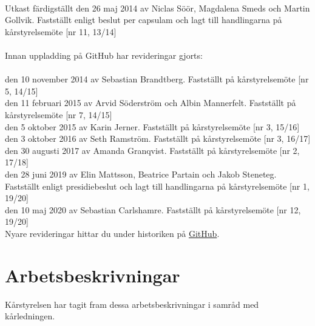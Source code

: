 
\newcommand{\sectionbreak}{\clearpage}


%
%
\vspace*{9 cm}
\noindent
{\huge{}}\\

\vspace{0.2cm}
\noindent
Utkast färdigställt den 26 maj 2014 av Niclas Söör, Magdalena Smeds och
Martin Gollvik. Fastställt enligt beslut per capsulam och lagt till
handlingarna på kårstyrelsemöte {[}nr 11, 13/14{]} \\ \\
Innan uppladding på GitHub har revideringar gjorts:\\ \\
  den 10 november 2014 av Sebastian Brandtberg. Fastställt på
  kårstyrelsemöte {[}nr 5, 14/15{]} \\
  den 11 februari 2015 av Arvid Söderström och Albin Mannerfelt.
  Fastställt på kårstyrelsemöte {[}nr 7, 14/15{]} \\
  den 5 oktober 2015 av Karin Jerner. Fastställt på kårstyrelsemöte
  {[}nr 3, 15/16{]} \\
  den 3 oktober 2016 av Seth Ramström. Fastställt på kårstyrelsemöte
  {[}nr 3, 16/17{]} \\
  den 30 augusti 2017 av Amanda Granqvist. Fastställt på kårstyrelsemöte
  {[}nr 2, 17/18{]} \\
  den 28 juni 2019 av Elin Mattsson, Beatrice Partain och Jakob
  Steneteg. Fastställt enligt presidiebeslut och lagt till handlingarna
  på kårstyrelsemöte {[}nr 1, 19/20{]} \\
  den 10 maj 2020 av Sebastian Carlshamre. Fastställt på kårstyrelsemöte
  {[}nr 12, 19/20{]} \\
  
  
  Nyare revideringar hittar du under historiken på \href{https://github.com/lucassevelin/Arbetsbeskrivningar-p-steroider}{GitHub}.

%
%
\vspace*{1 mm}
\tableofcontents

\hypertarget{arbetsbeskrivningar}{%
\section{Arbetsbeskrivningar}\label{arbetsbeskrivningar}}

Kårstyrelsen har tagit fram dessa arbetsbeskrivningar i samråd med
kårledningen.

